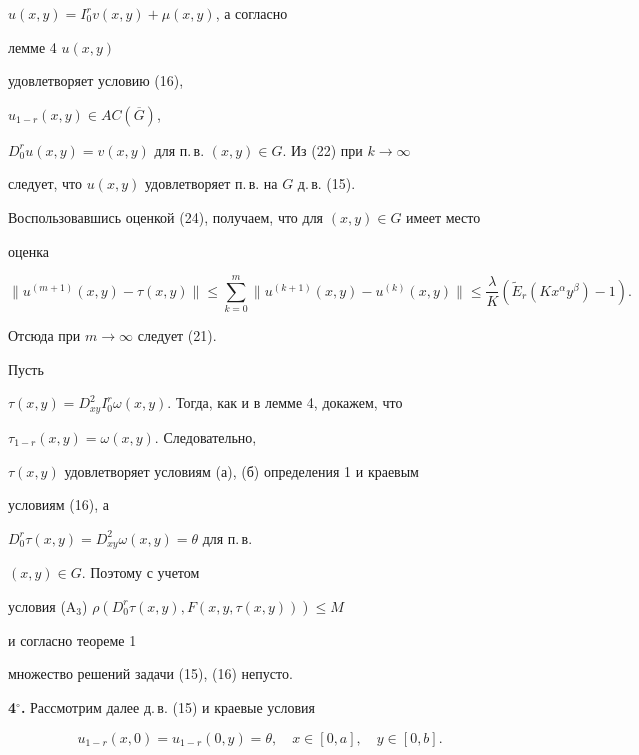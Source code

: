 \begin{pf}
$u(x,y)=I_0^rv(x,y)+\mu(x,y)$, а согласно 


лемме 4 $u(x,y)$ 


удовлетворяет условию (16), 


$u_{1-r}(x,y)\in AC(\overline G)$, 


$D_0^ru(x,y)=v(x,y)$ для п.\,в. $(x,y)\in G$. Из (22) при $k\to\infty$ 


следует, что $u(x,y)$ удовлетворяет п.\,в. на $G$ д.\,в. (15). 


 


Воспользовавшись оценкой (24), получаем, что для $(x,y)\in G$ имеет место 


оценка 


$$ 


\|u^{(m+1)}(x,y)-\tau(x,y)\|\le\sum^m_{k=0} 


\|u^{(k+1)}(x,y)-u^{(k)}(x,y)\|\le 


\frac{\lambda}{K}(\widetilde E_r(Kx^\alpha y^\beta)-1). 


$$ 


Отсюда при $m\to\infty$ следует (21). 


\end{pf} 


 


\begin{cornonum} Пусть 


$\tau(x,y)=D^2_{xy}I_0^r\omega(x,y)$. Тогда, как и в лемме 4, докажем, что 


$\tau_{1-r}(x,y)=\omega(x,y)$. Следовательно, 


$\tau(x,y)$ удовлетворяет условиям (а), (б) определения 1 и краевым 


условиям (16), а 


$D_0^r\tau(x,y)=D^2_{xy}\omega(x,y)=\theta$ для п.\,в. 


$(x,y)\in G$. Поэтому с учетом 


условия (A${}_3$) $\rho(D_0^r\tau(x,y),F(x,y,\tau(x,y)))\le M$ 


и согласно теореме 1 


множество решений задачи (15), (16) непусто. 


\end{cornonum} 


 


{\bf 4${}^\circ$.} Рассмотрим далее д.\,в. (15) и краевые условия 


\begin{equation} 


u_{1-r}(x,0)=u_{1-r}(0,y)=\theta,\quad x\in[0,a],\quad 


y\in [0,b].\tag{25} 


\end{equation} 


